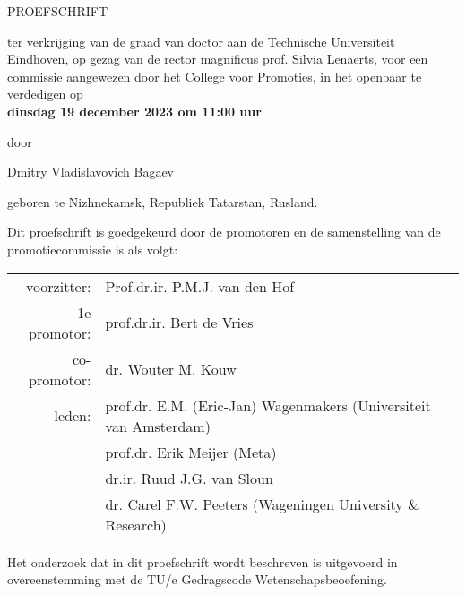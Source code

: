 
%
%

\thispagestyle{empty}
\noindent

\begin{center}

\huge %


\myTitleBreak
\vspace{3em}

\Large
PROEFSCHRIFT

\vspace{3em}

ter verkrijging van de graad van doctor aan de Technische Universiteit Eindhoven, op gezag van de rector magnificus prof. Silvia Lenaerts,
voor een commissie aangewezen door het College voor Promoties, in het openbaar te verdedigen op \\ \textbf{dinsdag 19 december 2023 om 11:00 uur}

\vspace{3em}

door

\vspace{3em}

Dmitry Vladislavovich Bagaev

\vspace{3em}

geboren te Nizhnekamsk, Republiek Tatarstan, Rusland.

\end{center}



\newpage
\thispagestyle{empty}
\normalsize

\noindent
Dit proefschrift is goedgekeurd door de promotoren en de samenstelling van de promotiecommissie is als volgt:
\vspace{1em}
\noindent

\begin{tabular}{r l}
voorzitter:     & Prof.dr.ir. P.M.J. van den Hof \\
1e promotor:    & prof.dr.ir. Bert de Vries \\
co-promotor:    & dr. Wouter M. Kouw \\
leden:  		& prof.dr. E.M. (Eric-Jan) Wagenmakers (Universiteit van Amsterdam) \\                
                & prof.dr. Erik Meijer (Meta) \\
                & dr.ir. Ruud J.G. van Sloun \\
                & dr. Carel F.W. Peeters (Wageningen University \& Research)  
\end{tabular}


\vfill

\noindent
Het onderzoek dat in dit proefschrift wordt beschreven is uitgevoerd in overeenstemming met de TU/e Gedragscode Wetenschapsbeoefening.
